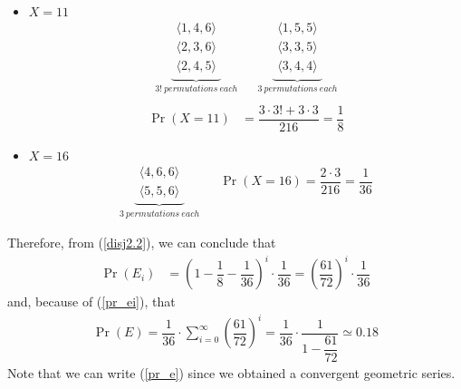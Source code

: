 \begin{itemize}

	\item $X = 11$
	\begin{align*}
		\underbrace{
			\begin{aligned}
				\langle 1,4,6 \rangle\\
				\langle 2,3,6 \rangle\\
				\langle 2,4,5 \rangle
			\end{aligned}
		}_{ 3! \ permutations \ each}
		&&\underbrace{
			\begin{aligned}
				\langle 1,5,5 \rangle\\
				\langle 3,3,5 \rangle\\
				\langle 3,4,4 \rangle
			\end{aligned}
		}_{ 3 \ permutations \ each}\\
	\end{align*}
	\begin{align*}
		\Pr(X = 11) &= \dfrac{3 \cdot 3! + 3 \cdot 3}{216} = \dfrac{1}{8}
	\end{align*}
	
	\item $X = 16$
	\begin{align*}
		\underbrace{
			\begin{aligned}
				\langle 4,6,6 \rangle\\
				\langle 5,5,6 \rangle
			\end{aligned}
		}_{ 3 \ permutations \ each}
		&&\Pr(X = 16) = \dfrac{2 \cdot 3}{216} = \dfrac{1}{36}
	\end{align*}

\end{itemize}
Therefore, from (\ref{disj2.2}), we can conclude that
\begin{align}
	\Pr(E_i) &= \left( 1 - \dfrac{1}{8} - \dfrac{1}{36} \right)^i \cdot \dfrac{1}{36} = \left( \dfrac{61}{72} \right)^i \cdot \dfrac{1}{36} \label{pr_ei}
\end{align}
and, because of (\ref{pr_ei}), that
\begin{align}
	\Pr(E) = \dfrac{1}{36} \cdot \sum_{i = 0}^{\infty}\left( \dfrac{61}{72} \right)^i = \dfrac{1}{36} \cdot \dfrac{1}{1 - \dfrac{61}{72}} \simeq 0.18 \label{pr_e}
\end{align}
Note that we can write (\ref{pr_e}) since we obtained a convergent geometric series.\\

















